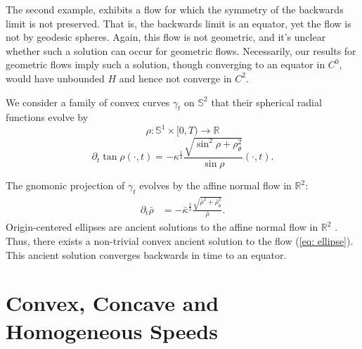 \documentclass{amsart}
\begin{document}
The second example, exhibits a flow for which the symmetry of the backwards limit is not preserved. That is, the backwards limit is an equator, yet the flow is not by geodesic spheres. Again, this flow is not geometric, and it's unclear whether such a solution can occur for geometric flows. Necessarily, our results for geometric flows imply such a solution, though converging to an equator in \(C^0\), would have unbounded \(H\) and hence not converge in \(C^2\).

\begin{example}
We consider a family of convex curves $\gamma_t$ on $\mathbb{S}^2$ that their spherical radial functions evolve by
\[\rho:\mathbb{S}^1\times[0,T)\to \mathbb{R}\]
\begin{equation}\label{eq: ellipse}
\partial_t\tan\rho(\cdot,t)=-\kappa^{\frac{1}{3}} \frac{\sqrt{\sin^2\rho+\rho_{\theta}^2}}{\sin\rho}(\cdot,t).
\end{equation}

The gnomonic projection of $\gamma_t$ evolves by the affine normal flow in $\mathbb{R}^2:$ 
\begin{align*}
\partial_t\bar{\rho}&=-\bar{\kappa}^{\frac{1}{3}}\frac{\sqrt{\bar{\rho}^2+\bar{\rho}_{\theta}^2}}{\bar{\rho}}.
\end{align*}
Origin-centered ellipses are ancient solutions to the affine normal flow in $\mathbb{R}^2$ \cite{Ivaki:2016}. Thus, there exists a non-trivial convex ancient solution to the flow (\ref{eq: ellipse}). This ancient solution converges backwards in time to an equator.
\end{example}

\section{Convex, Concave and Homogeneous Speeds}
\label{sec:convex_concave_homogeneous}
\end{document}
